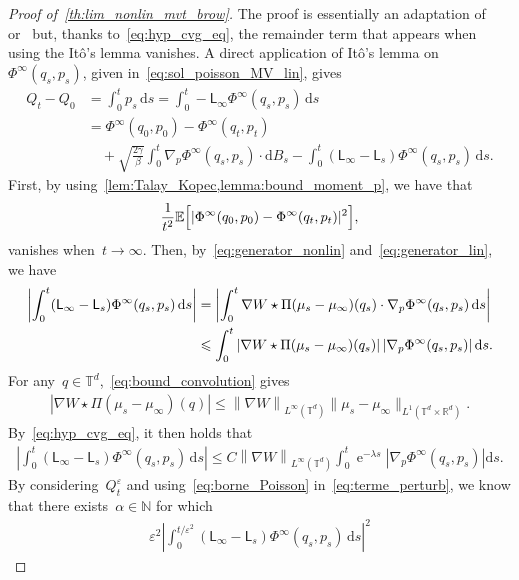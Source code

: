 \documentclass[onefignum,onetabnum]{siamart251216} %
\DeclareMathOperator{\e}{e}
\renewcommand{\d}{\mathrm{d}}
\newcommand{\expect}{\mathbb E}
\newcommand{\norm}[1]{\left\lVert#1\right\rVert}
\newcommand{\torus}{\mathbb T}
\newcommand{\real}{\mathbb R}
\renewcommand{\leq}{\leqslant}
\newcommand{\mescin}{\mu}
\newcommand{\normT}[1]{\norm{#1}_{L^\infty(\torus^d)}}
\newcommand{\projp}{\Pi}
\newcommand{\gennonlin}[1]{\mathsf{L}_{#1}}
\newcommand{\genlin}{\mathsf{L}_\infty}
\newcommand{\eps}{\varepsilon}
\newcommand{\SolPois}{\Phi^\infty}
\theoremstyle{plain}
\numberwithin{equation}{section}
\numberwithin{theorem}{section}
\begin{document}
\begin{proof}[Proof of~\cref{th:lim_nonlin_mvt_brow}]
The proof is essentially an adaptation of~\cite[Theorem 1.5]{olla1994homogenization} or~\cite[Theorem 1]{fathi2015error} but, thanks to~\eqref{eq:hyp_cvg_eq}, the remainder term that appears when using the It\^o's lemma vanishes. A direct application of It\^o's lemma on~$\SolPois(q_s,p_s)$, given in~\eqref{eq:sol_poisson_MV_lin}, gives
\begin{align*}
    Q_t - Q_0 &= \int_0^t p_s\, \d s = \int_0^t -\genlin\SolPois(q_s,p_s)\, \d s \\
    &= \SolPois(q_0,p_0)-\SolPois(q_t,p_t) \\
    &\quad +\sqrt{\frac{2\gamma}{\beta}}\int_0^t \nabla_p\SolPois(q_s,p_s)\cdot\d B_s
    - \int_0^t (\genlin- \gennonlin{s}) \SolPois(q_s,p_s)\, \d s.
\end{align*}
First, by using~\cref{lem:Talay_Kopec,lemma:bound_moment_p}, we have that
\[
\frac{1}{t^2}\expect\Bigl[|\SolPois(q_0,p_0)-\SolPois(q_t,p_t)|^2\Bigr],
\]
vanishes when~$t \to \infty$.
Then, by~\eqref{eq:generator_nonlin} and~\eqref{eq:generator_lin}, we have
\begin{align*}
    \left|\int_0^t (\genlin- \gennonlin{s}) \SolPois(q_s,p_s)\, \d s\right|
    &= \left|\int_0^t \nabla W \star \projp(\mescin_s - \mescin_\infty)(q_s)\cdot \nabla_p\SolPois(q_s,p_s)\, \d s\right| \\
    \notag
    &\leq \int_0^t \left|\nabla W \star \projp(\mescin_s - \mescin_\infty)(q_s)\right|\left|\nabla_p\SolPois(q_s,p_s)\right| \d s.
\end{align*}
For any~$q \in \torus^d$,~\eqref{eq:bound_convolution} gives
\begin{align}
    \label{eq:bound_remainder}
    |\nabla W \star \projp(\mescin_s - \mescin_\infty)(q)|
   \leq \normT{\nabla W} \|\mescin_s - \mescin_\infty\|_{L^1(\torus^d\times\real^d)}.
\end{align}
By~\eqref{eq:hyp_cvg_eq},
it then holds that
\begin{align}
    \label{eq:terme_perturb}
    \left|\int_0^t (\genlin- \gennonlin{s}) \SolPois(q_s,p_s)\, \d s\right|
    \leq C\normT{\nabla W}\int_0^t \e^{-\lambda s}\left|\nabla_p\SolPois(q_s,p_s)\right| \d s.
\end{align}
By considering~$Q_t^\eps$ and using~\eqref{eq:borne_Poisson} in~\eqref{eq:terme_perturb}, we know that there exists~$\alpha\in\mathbb{N}$ for which
\begin{align}
    \label{eq:ineq_finale_diff}
    \eps^2\left|\int_0^{t/\eps^2} (\genlin- \gennonlin{s}) \SolPois(q_s,p_s)\, \d s\right|^2

\end{align}
\end{proof}
\end{document}
